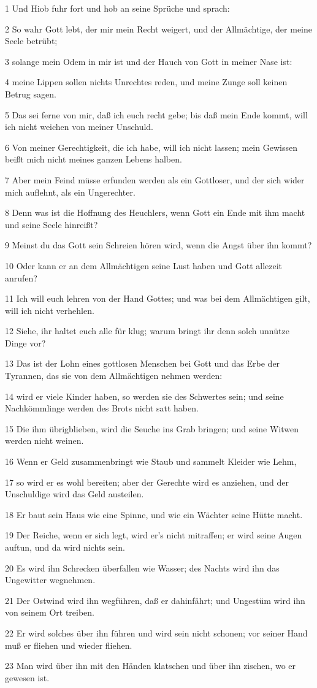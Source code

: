 \par 1 Und Hiob fuhr fort und hob an seine Sprüche und sprach:
\par 2 So wahr Gott lebt, der mir mein Recht weigert, und der Allmächtige, der meine Seele betrübt;
\par 3 solange mein Odem in mir ist und der Hauch von Gott in meiner Nase ist:
\par 4 meine Lippen sollen nichts Unrechtes reden, und meine Zunge soll keinen Betrug sagen.
\par 5 Das sei ferne von mir, daß ich euch recht gebe; bis daß mein Ende kommt, will ich nicht weichen von meiner Unschuld.
\par 6 Von meiner Gerechtigkeit, die ich habe, will ich nicht lassen; mein Gewissen beißt mich nicht meines ganzen Lebens halben.
\par 7 Aber mein Feind müsse erfunden werden als ein Gottloser, und der sich wider mich auflehnt, als ein Ungerechter.
\par 8 Denn was ist die Hoffnung des Heuchlers, wenn Gott ein Ende mit ihm macht und seine Seele hinreißt?
\par 9 Meinst du das Gott sein Schreien hören wird, wenn die Angst über ihn kommt?
\par 10 Oder kann er an dem Allmächtigen seine Lust haben und Gott allezeit anrufen?
\par 11 Ich will euch lehren von der Hand Gottes; und was bei dem Allmächtigen gilt, will ich nicht verhehlen.
\par 12 Siehe, ihr haltet euch alle für klug; warum bringt ihr denn solch unnütze Dinge vor?
\par 13 Das ist der Lohn eines gottlosen Menschen bei Gott und das Erbe der Tyrannen, das sie von dem Allmächtigen nehmen werden:
\par 14 wird er viele Kinder haben, so werden sie des Schwertes sein; und seine Nachkömmlinge werden des Brots nicht satt haben.
\par 15 Die ihm übrigblieben, wird die Seuche ins Grab bringen; und seine Witwen werden nicht weinen.
\par 16 Wenn er Geld zusammenbringt wie Staub und sammelt Kleider wie Lehm,
\par 17 so wird er es wohl bereiten; aber der Gerechte wird es anziehen, und der Unschuldige wird das Geld austeilen.
\par 18 Er baut sein Haus wie eine Spinne, und wie ein Wächter seine Hütte macht.
\par 19 Der Reiche, wenn er sich legt, wird er's nicht mitraffen; er wird seine Augen auftun, und da wird nichts sein.
\par 20 Es wird ihn Schrecken überfallen wie Wasser; des Nachts wird ihn das Ungewitter wegnehmen.
\par 21 Der Ostwind wird ihn wegführen, daß er dahinfährt; und Ungestüm wird ihn von seinem Ort treiben.
\par 22 Er wird solches über ihn führen und wird sein nicht schonen; vor seiner Hand muß er fliehen und wieder fliehen.
\par 23 Man wird über ihn mit den Händen klatschen und über ihn zischen, wo er gewesen ist.

